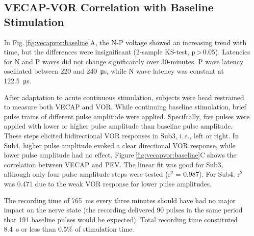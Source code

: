 \subsection{VECAP-VOR Correlation with Baseline Stimulation}
In Fig.\,\ref{fig:vecapvor:baseline}A, the N-P voltage showed an increasing trend with time, but the differences were insignificant (2-sample KS-test, p\,\textgreater\,0.05). Latencies for N and P waves did not change significantly over 30-minutes. P wave latency oscillated between 220 and \SI{240}{\micro\second}, while N wave latency was constant at \SI{122.5}{\micro\second}. 

After adaptation to acute continuous stimulation, subjects were head restrained to measure both VECAP and VOR. While continuing baseline stimulation, brief pulse trains of different pulse amplitude were applied. Specifcally, five pulses were applied with lower or higher pulse amplitude than baseline pulse amplitude. These steps elicited bidirectional VOR responses in Sub3, i.\,e., left or right. In Sub4, higher pulse amplitude evoked a clear directional VOR response, while lower pulse amplitude had no effect. Figure\,\ref{fig:vecapvor:baseline}C shows the correlation between VECAP and PEV. The linear fit was good for Sub3, although only four pulse amplitude steps were tested (r$^2$ = 0.987). For Sub4, r$^2$ was 0.471 due to the weak VOR response for lower pulse amplitudes.

The recording time of \SI{765}{\milli\second} every three minutes should have had no major impact on the nerve state (the recording delivered 90 pulses in the same period that 191 baseline pulses would be expected). Total recording time constituted \SI{8.4}{s} or less than 0.5\% of stimulation time. 

